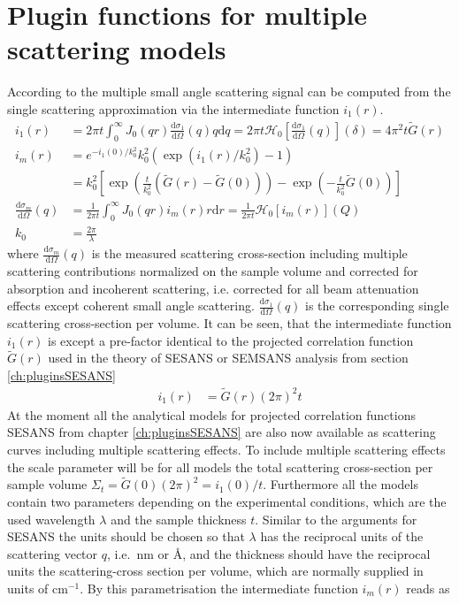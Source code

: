 \clearpage
\section{Plugin functions for multiple scattering models}
\label{ch:pluginsMSANS}

According to \cite{Schelten1980,Jensen2018} the multiple  small angle scattering signal can be computed from the single scattering approximation via the intermediate function $i_1(r)$.
\begin{align}\label{eq:MSAS_SchmatzSchelten}
 i_1(r) &= 2\pi t \int_0^\infty J_0(qr) \frac{\mathrm{d}\sigma_1}{\mathrm{d}\Omega}(q) q \mathrm{d}q =2\pi t \mathcal{H}_0\left[\frac{\mathrm{d}\sigma_1}{\mathrm{d}\Omega}(q)\right](\delta)= 4\pi^2 t \tilde{G}(r)\\
 i_m(r) &= e^{-i_1(0)/k_0^2}k_0^2\left(\exp\left(i_1(r)/k_0^2\right)-1\right) \\
        &= k_0^2\left[\exp\left(\frac{t}{k_0^2}\left(\tilde{G}(r)-\tilde{G}(0)\right)\right)-\exp\left(-\frac{t}{k_0^2}\tilde{G}(0)\right)\right]\\
 \frac{\mathrm{d}\sigma_m}{\mathrm{d}\Omega}(q)&= \frac{1}{2\pi t} \int_0^\infty J_0(qr) i_m(r) r \mathrm{d}r = \frac{1}{2\pi t} \mathcal{H}_0\left[i_m(r)\right](Q) \\
 k_0 &= \frac{2\pi}{\lambda}
\end{align}
where $\frac{\mathrm{d}\sigma_m}{\mathrm{d}\Omega}(q)$ is the measured scattering cross-section including multiple scattering contributions normalized on the sample volume and  corrected for absorption and incoherent scattering, i.e. corrected for all beam attenuation effects except coherent small angle scattering. $\frac{\mathrm{d}\sigma_1}{\mathrm{d}\Omega}(q)$ is the corresponding single scattering cross-section per volume.
It can be seen, that the intermediate function $i_1(r)$ is except a pre-factor identical to the projected correlation function $\tilde{G}(r)$ used in the theory of  SESANS or SEMSANS analysis from section \ref{ch:pluginsSESANS}
\begin{align}
i_1(r)&=\tilde{G}(r)\left(2\pi\right)^2t
\end{align}
At the moment all the analytical models for projected correlation functions SESANS from chapter \ref{ch:pluginsSESANS} are also now available as scattering curves including multiple scattering effects. To include multiple scattering effects the scale parameter will be for all models the total scattering cross-section per sample volume $\Sigma_t=\tilde{G}(0)(2\pi)^2=i_1(0)/t$. Furthermore all the models contain two parameters  depending on the experimental conditions, which are the used wavelength $\lambda$ and the sample thickness $t$. Similar to the arguments for SESANS \cite{Kohlbrecher2017} the units should be chosen so that  $\lambda$ has the reciprocal units of the scattering vector $q$, i.e.\ nm or {\AA}, and the thickness should have the reciprocal units the scattering-cross section per volume, which are normally supplied in units of cm$^{-1}$. By this parametrisation the intermediate function $i_m(r)$ reads as
